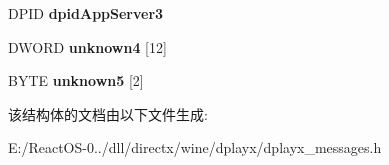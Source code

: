 \begin{DoxyCompactItemize}
\item 
\mbox{\label{structtag_d_p_m_s_g___f_o_r_w_a_r_d_a_d_d_p_l_a_y_e_r_a92009a4e65949f63cdcf4b5c8bdd9e4d}} 
D\+P\+ID {\bfseries dpid\+App\+Server3}
\item 
\mbox{\label{structtag_d_p_m_s_g___f_o_r_w_a_r_d_a_d_d_p_l_a_y_e_r_a388fa24d7e4166545db6803fcdf34fbc}} 
D\+W\+O\+RD {\bfseries unknown4} \mbox{[}12\mbox{]}
\item 
\mbox{\label{structtag_d_p_m_s_g___f_o_r_w_a_r_d_a_d_d_p_l_a_y_e_r_ae41989762d72083f91fd9e5b11489721}} 
B\+Y\+TE {\bfseries unknown5} \mbox{[}2\mbox{]}
\end{DoxyCompactItemize}


该结构体的文档由以下文件生成\+:\begin{DoxyCompactItemize}
\item 
E\+:/\+React\+O\+S-\/0../dll/directx/wine/dplayx/dplayx\+\_\+messages.\+h\end{DoxyCompactItemize}
